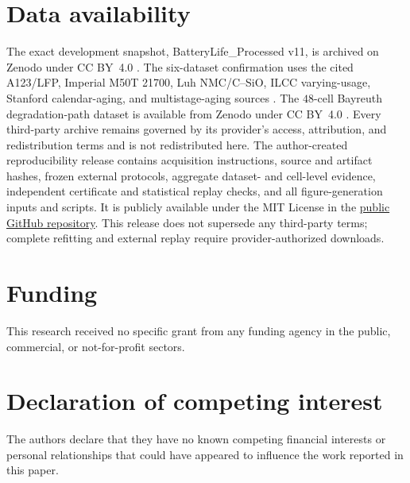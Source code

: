 \documentclass[preprint,12pt]{elsarticle}
\begin{document}
\section*{Data availability}

The exact development snapshot, BatteryLife\_Processed v11, is archived on Zenodo under CC BY~4.0 \citep{batterylife2026processed}. The six-dataset confirmation uses the cited A123/LFP, Imperial M50T 21700, Luh NMC/C--SiO, ILCC varying-usage, Stanford calendar-aging, and multistage-aging sources \citep{wheeler2025lfp,kirkaldy2024comprehensive,luh2024dataset,li2024varyingusage,lam2025calendar,stroebl2024multistage}. The $48$-cell Bayreuth degradation-path dataset is available from Zenodo under CC BY~4.0 \citep{roder2025degradationdata}. Every third-party archive remains governed by its provider's access, attribution, and redistribution terms and is not redistributed here. The author-created reproducibility release contains acquisition instructions, source and artifact hashes, frozen external protocols, aggregate dataset- and cell-level evidence, independent certificate and statistical replay checks, and all figure-generation inputs and scripts. It is publicly available under the MIT License in the \href{https://github.com/xiansuqiushui-dotcom/pchp-battery-capacity-retention}{public GitHub repository}. This release does not supersede any third-party terms; complete refitting and external replay require provider-authorized downloads.

\section*{Funding}

This research received no specific grant from any funding agency in the public, commercial, or not-for-profit sectors.

\section*{Declaration of competing interest}

The authors declare that they have no known competing financial interests or personal relationships that could have appeared to influence the work reported in this paper.

\begingroup
{}


\endgroup
\end{document}
